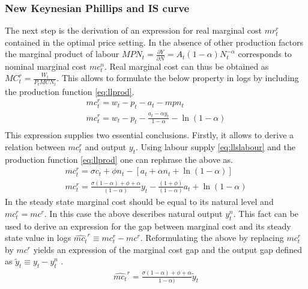 \documentclass[12pt,a4paper,english]{article} %
\begin{document}
	\subsubsection{New Keynesian Phillips and IS curve} \label{nk_nkp_is}
	The next step is the derivation of an expression for real marginal cost $mr_{t}^r$ contained in the optimal price setting. In the absence of other production factors the marginal product of labour $MPN_t = \frac{\partial Y}{\partial N} = A_t (1- \alpha) N_t^{-\alpha}$ corresponds to nominal marginal cost $mc_t^n$. Real marginal cost can thus be obtained as $MC_t^r = \frac{W_t}{P_t MCN_t}$. This allows to formulate the below property in logs by including the production function \eqref{eq:llprod}.
	\begin{equation} \label{eq:26}
		\begin{aligned}
			mc_t^r = w_t - p_t - a_t - mpn_t \\
			mc_t^r = w_t - p_t - \frac{a_t - \alpha y_t}{1 - \alpha} - \ln(1 - \alpha) \\
		\end{aligned}
	\end{equation}
	This expression supplies two essential conclusions. 
	Firstly, it allows to derive a relation between $mc_t^r$ and output $y_t$. Using labour supply \eqref{eq:llslabour} and the production function \eqref{eq:llprod} one can rephrase the above as. 
	\begin{equation}
		\begin{aligned}
			mc_t^r = \sigma c_t + \phi n_t - [a_t + \alpha n_t + \ln(1-\alpha)] \\
			mc_t^r = 
			\frac{
				\sigma (1 - \alpha) + \phi + \alpha
			}{
				(1 - \alpha)	
			}	 y_t
			- \frac{
				(1 + \phi)	
			}{
				(1 - \alpha)	
			} a_t
			+ \ln(1-\alpha)
		\end{aligned}
	\end{equation}
	In the steady state marginal cost should be equal to its natural level and $mc_t^r = mc^r$. In this case the above describes natural output $y_t^n$. This fact can be used to derive an expression for the gap between marginal cost and its steady state value in logs $\hat{mc_t}^r \equiv mc_t^r - mc^r$. Reformulating the above by replacing $mc_t^r$ by $mc^r$ yields an expression of the marginal cost gap and the output gap defined as $\tilde{y}_t \equiv y_t - y_t^n$ . 
	\begin{equation} \label{eq:llmcrhat}
		\begin{aligned}
			\hat{mc_t}^r = \frac{\sigma (1 - \alpha) + \phi + \alpha}
			{1 - \alpha)} \tilde{y}_t
		\end{aligned}
	\end{equation}
\end{document}
